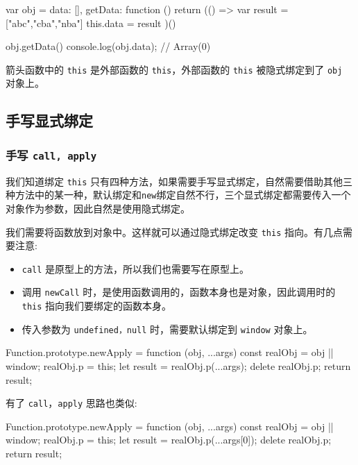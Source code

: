 \begin{JavaScript}
var obj = {
  data: [],
  getData: function () {
    return (() => {
      var result = ["abc","cba","nba"]
      this.data = result
    })()
  }
}
 
obj.getData()
console.log(obj.data);  // Array(0)
\end{JavaScript}

箭头函数中的 \texttt{this} 是外部函数的 \texttt{this}，外部函数的 \texttt{this} 被隐式绑定到了 \texttt{obj} 对象上。

\subsection{手写显式绑定}

\subsubsection*{手写 \texttt{call, apply}}

我们知道绑定 \texttt{this} 只有四种方法，如果需要手写显式绑定，自然需要借助其他三种方法中的某一种，默认绑定和\texttt{new}绑定自然不行，三个显式绑定都需要传入一个对象作为参数，因此自然是使用隐式绑定。

我们需要将函数放到对象中。这样就可以通过隐式绑定改变 \texttt{this} 指向。有几点需要注意:
\begin{itemize}
  \item \texttt{call} 是原型上的方法，所以我们也需要写在原型上。
  \item 调用 \texttt{newCall} 时，是使用函数调用的，函数本身也是对象，因此调用时的 \texttt{this} 指向我们要绑定的函数本身。
  \item 传入参数为 \texttt{undefined，null} 时，需要默认绑定到 \texttt{window} 对象上。
\end{itemize}

\begin{JavaScript}
Function.prototype.newApply = function (obj, ...args) {
  const realObj = obj || window;
  realObj.p = this;
  let result = realObj.p(...args);
  delete realObj.p;
  return result;
}
\end{JavaScript}

有了 \texttt{call}，\texttt{apply} 思路也类似:

\begin{JavaScript}
Function.prototype.newApply = function (obj, ...args) {
  const realObj = obj || window;
  realObj.p = this;
  let result = realObj.p(...args[0]);
  delete realObj.p;
  return result;
}
\end{JavaScript}

